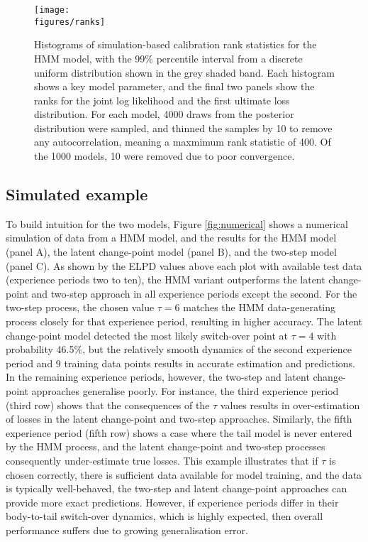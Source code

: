 \begin{figure}
    \centering
    \texttt{[image: \\figures/ranks]}
    \caption{
		Histograms of simulation-based calibration
		rank statistics for the HMM model, 
        with the 99\% percentile
        interval from a discrete uniform distribution
        shown in the grey shaded band.
        Each histogram shows a key model parameter,
        and the final two panels show the ranks
        for the joint log
        likelihood and the first ultimate loss
        distribution.
        For each model, 
        4000 draws from the posterior distribution
        were sampled,
        and thinned the samples by 10 to remove any
        autocorrelation, meaning a maxmimum rank statistic
        of 400. Of the 1000 models,
        10 were removed due to poor convergence.
    }
	\label{fig:sbc}
\end{figure}

\subsection{Simulated example}
To build intuition for the two models,
Figure \ref{fig:numerical} shows a numerical
simulation of data from a HMM model,
and the results for the HMM model
(panel A), the latent change-point
model (panel B), and the
two-step model (panel C).
As shown by the ELPD values above each
plot with available test data (experience
periods two to ten), 
the HMM variant outperforms
the latent change-point and two-step approach
in all
experience periods except the second.
For the two-step process, the chosen value $\tau = 6$
matches the HMM data-generating process
closely for that experience period, 
resulting in higher accuracy. 
The latent change-point model detected the most
likely switch-over point at $\tau = 4$ with probability
46.5\%, but the relatively smooth dynamics of the
second experience period and 9 training data points
results in accurate estimation and predictions. 
In the remaining experience
periods, however, the two-step and latent change-point approaches
generalise poorly.
For instance, the third experience period (third row)
shows that the consequences of the $\tau$ values results
in over-estimation of losses in the latent change-point
and two-step approaches.
Similarly, the fifth experience period (fifth row)
shows a case where the tail model is never
entered by the HMM process, and the
latent change-point and two-step processes
consequently under-estimate true losses.
This example illustrates that
if $\tau$ is chosen correctly, there is sufficient
data available for model training,
and the data is typically well-behaved,
the two-step and latent change-point approaches 
can provide more exact predictions.
However, if experience periods differ in their
body-to-tail switch-over dynamics,
which is highly expected, then overall
performance suffers due to
growing generalisation error.

